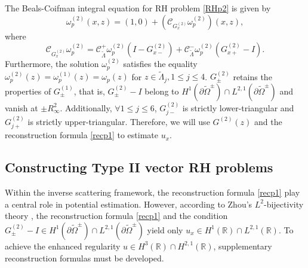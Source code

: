 \documentclass[preprint,compress,12pt]{elsarticle}
\numberwithin{equation}{section}
\begin{document}
The Beals-Coifman integral equation for RH problem \ref{RHp2} is given by
\begin{equation}
\omega_{p}^{(2)}(x,z)=(1,0)+(\mathcal{C}_{G_{x}^{(2)}}\omega_{p}^{(2)})(x,z),
\end{equation}
where
\begin{equation}
\mathcal{C}_{G_{x}^{(2)}}\omega_{p}^{(2)}=\mathcal{C}_{\widetilde{\Lambda}}^{+}\omega_{p}^{(2)}(I-G_{x-}^{(2)})+\mathcal{C}_{\widetilde{\Lambda}}^{-}\omega_{p}^{(2)}(G_{x+}^{(2)}-I).
\end{equation}
Furthermore, the solution $\omega_{p}^{(2)}$  satisfies the equality $\omega_{p}^{(2)}(z)=\omega_{p}^{(1)}(z)=\omega_{p}(z)$ for $z\in\widetilde{\Lambda}_{j}, 1\leq j\leq4$. $G^{(2)}_{\pm}$ retains the properties of  $G^{(1)}_{\pm}$, that is,  $G^{(2)}_{\pm}-I$ belong to $H^{1}(\partial\widetilde{\Omega}^{\pm})\cap L^{2,1}(\partial\widetilde{\Omega}^{\pm})$ and vanish at $\pm R_{\infty}^{2}$. Additionally, $\forall 1\leq j\leq6$, $G^{(2)}_{j-}$  is strictly lower-triangular and $G^{(2)}_{j+}$  is strictly upper-triangular.  Therefore, we will use $G^{(2)}(z)$ and the reconstruction formula \eqref{recp1} to estimate $u_{x}$.

\subsection{Constructing Type II vector RH problems}\label{sub33}
Within the inverse scattering framework, the reconstruction formula \eqref{recp1} play a central role in potential estimation.
However, according to Zhou's $L^{2}$-bijectivity theory \cite{Zhou1998}, the reconstruction formula \eqref{recp1} and the condition $G^{(2)}_{\pm}-I\in H^{1}(\partial\widetilde{\Omega}^{\pm})\cap L^{2,1}(\partial\widetilde{\Omega}^{\pm})$ yield only $u_{x}\in H^{1}(\mathbb{R})\cap L^{2,1}(\mathbb{R})$. To achieve the enhanced regularity $u\in H^{3}(\mathbb{R})\cap H^{2,1}(\mathbb{R})$, supplementary reconstruction formulas must be developed.
\end{document}

